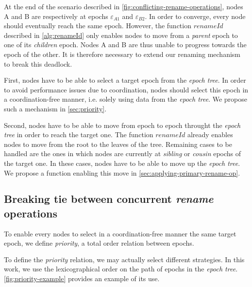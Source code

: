\documentclass[10pt,journal,compsoc]{IEEEtran}
\newcommand{\ie}{i.e. }
\newcommand{\trm}[1]{\mathit{#1}}
\newcommand{\epoch}[1]{$\varepsilon_{#1}$}
\begin{document}
At the end of the scenario described in \autoref{fig:conflicting-rename-operations}, nodes A and B are respectively at epochs \epoch{A1} and \epoch{B2}.
In order to converge, every node should eventually reach the same epoch.
However, the function $\trm{renameId}$ described in \autoref{alg:renameId} only enables nodes to move from a \emph{parent} epoch to one of its \emph{children} epoch.
Nodes A and B are thus unable to progress towards the epoch of the other.
It is therefore necessary to extend our renaming mechanism to break this deadlock.

First, nodes have to be able to select a target epoch from the \emph{epoch tree}.
In order to avoid performance issues due to coordination, nodes should select this epoch in a coordination-free manner, \ie solely using data from the \emph{epoch tree}.
We propose such a mechanism in \autoref{sec:priority}.

Second, nodes have to be able to move from epoch to epoch throught the \emph{epoch tree} in order to reach the target one.
The function $\trm{renameId}$ already enables nodes to move from the root to the leaves of the tree.
Remaining cases to be handled are the ones in which nodes are currently at \emph{sibling} or \emph{cousin} epochs of the target one.
In these cases, nodes have to be able to move up the \emph{epoch tree}.
We propose a function enabling this move in \autoref{sec:applying-primary-rename-op}.

\subsection{Breaking tie between concurrent \emph{rename} operations}
\label{sec:priority}

To enable every nodes to select in a coordination-free manner the same target epoch, we define \emph{priority}, a total order relation between epochs.

To define the \emph{priority} relation, we may actually select different strategies.
In this work, we use the lexicographical order on the path of epochs in the \emph{epoch tree}.
\autoref{fig:priority-example} provides an example of its use.
\end{document}
